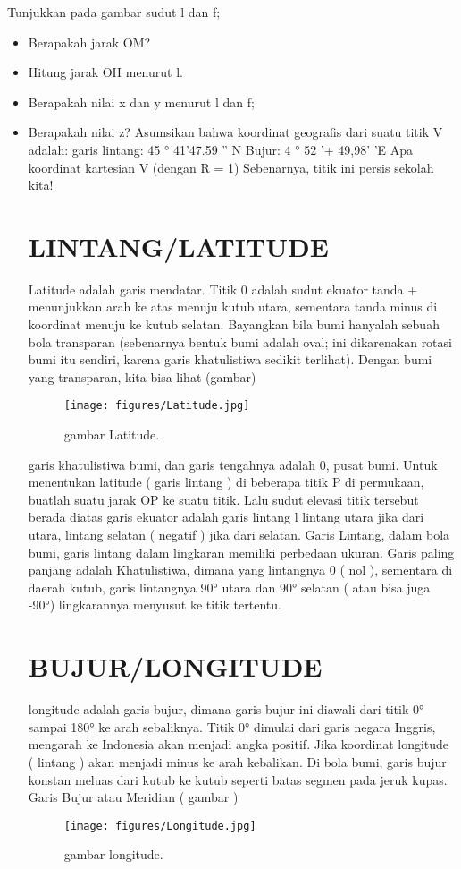 	Tunjukkan pada gambar sudut l dan f;
	\begin{itemize}
	\item Berapakah jarak OM?
	\item Hitung jarak OH menurut l.
	\item Berapakah nilai x dan y menurut l dan f;
	\item Berapakah nilai z?
	Asumsikan bahwa koordinat geografis dari suatu titik V
	adalah:
	garis lintang: 45 ° 41'47.59 '' N
	Bujur: 4 ° 52 '+ 49,98' 'E
	Apa koordinat kartesian V (dengan R = 1)
	Sebenarnya, titik ini persis sekolah kita!
	\begin{itemize}

\section{LINTANG/LATITUDE}

	Latitude adalah garis mendatar. Titik 0 adalah sudut ekuator tanda + menunjukkan arah ke atas menuju kutub utara,
	sementara tanda minus di koordinat menuju ke kutub selatan. Bayangkan bila bumi hanyalah sebuah bola transparan 
	(sebenarnya bentuk bumi adalah oval; ini dikarenakan rotasi bumi itu sendiri, karena garis khatulistiwa sedikit 
	terlihat). Dengan bumi yang transparan, kita bisa lihat (gambar)
	\begin{figure}[ht]
	\centerline{\texttt{[image: figures/Latitude.jpg]}}
	\caption{gambar Latitude.}
	\label{Gambar Latitude}
	\end{figure}
	garis khatulistiwa bumi, dan garis tengahnya adalah
	0, pusat bumi. Untuk menentukan latitude ( garis lintang ) di beberapa titik P di permukaan, buatlah suatu jarak OP 
	ke suatu titik. Lalu sudut elevasi titik tersebut berada diatas garis ekuator adalah garis lintang l lintang utara
	jika dari utara, lintang selatan ( negatif ) jika dari selatan. 
	Garis Lintang, dalam bola bumi, garis lintang dalam lingkaran memiliki perbedaan ukuran. Garis paling panjang adalah 
	Khatulistiwa, dimana yang lintangnya 0 ( nol ), sementara di daerah kutub, garis lintangnya 90° utara dan 90° selatan
	( atau bisa juga -90°) lingkarannya menyusut ke titik tertentu.

\section{BUJUR/LONGITUDE}

	longitude adalah garis bujur, dimana garis bujur ini diawali dari titik 0° sampai 180° ke arah sebaliknya. Titik 0° dimulai dari
	garis negara Inggris, mengarah ke Indonesia akan menjadi angka positif. Jika koordinat longitude ( lintang ) akan menjadi minus 
	ke arah kebalikan. Di bola bumi, garis bujur konstan meluas dari kutub ke kutub seperti batas segmen pada jeruk kupas. Garis Bujur atau
	Meridian ( gambar )
	\begin{figure}[ht]
	\centerline{\texttt{[image: figures/Longitude.jpg]}}
	\caption{gambar longitude.}
	\label{Gambar Longitude}
	\end{figure}
	


\end{itemize}
\end{itemize}
